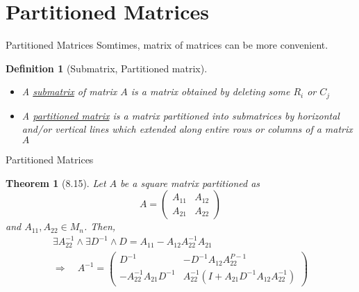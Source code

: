 \documentclass[final]{beamer}
\newtheorem{defn}{Definition}
\newtheorem{thm}{Theorem}
\begin{document}
%

\section{Partitioned Matrices} %
\label{sec:partitioned_matrices}
\begin{frame}[t]{Partitioned Matrices}
	Somtimes, matrix of matrices can be more convenient.
	\begin{defn}
		[Submatrix, Partitioned matrix]
		\begin{itemize}
			\item A \uline{submatrix} of matrix $A$ is a matrix obtained by deleting some $R_i$ or $C_j$
			\item A \uline{partitioned matrix} is a matrix partitioned into submatrices by horizontal and/or vertical lines which extended along entire rows or columns of a matrix $A$
		\end{itemize}
	\end{defn}
\end{frame}
\begin{frame}[t]{Partitioned Matrices}
	\begin{thm}
		[8.15] Let $A$ be a square matrix partitioned as\[
			A=\begin{pmatrix}
				A_{11}&A_{12}\\
				A_{21}&A_{22}
			\end{pmatrix}
		\] and $A_{11}, A_{22}\in M_n$. Then, 
		\begin{multline*}
			\exists A_{22}^{-1}\land \exists D^{-1} \land D=A_{11}-A_{12}A_{22}^{-1}A_{21} \\\Rightarrow\quad A^{-1}=\begin{pmatrix}
				D^{-1}& -D^{-1}A_{12}A_{22}^{P-1}\\
				-A_{22}^{-1}A_{21}D^{-1}&A_{22}^{-1}(I+A_{21}D^{-1}A_{12}A_{22}^{-1})
			\end{pmatrix}
		\end{multline*}
	\end{thm}
\end{frame}

%
\end{document}
